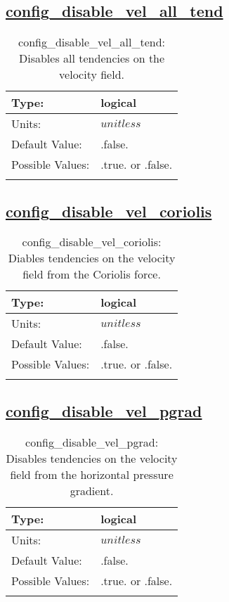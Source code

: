 \subsection[config\_disable\_vel\_all\_tend]{\hyperref[sec:nm_tab_debug]{config\_disable\_vel\_all\_tend}}
\label{subsec:nm_sec_config_disable_vel_all_tend}
\begin{center}
\begin{longtable}{| p{2.0in} | p{4.0in} |}
    \hline
    Type: & logical \\
    \hline
    Units: & $unitless$ \\
    \hline
    Default Value: & .false. \\
    \hline
    Possible Values: & .true. or .false. \\
    \hline
    \caption{config\_disable\_vel\_all\_tend: Disables all tendencies on the velocity field.}
\end{longtable}
\end{center}
\subsection[config\_disable\_vel\_coriolis]{\hyperref[sec:nm_tab_debug]{config\_disable\_vel\_coriolis}}
\label{subsec:nm_sec_config_disable_vel_coriolis}
\begin{center}
\begin{longtable}{| p{2.0in} | p{4.0in} |}
    \hline
    Type: & logical \\
    \hline
    Units: & $unitless$ \\
    \hline
    Default Value: & .false. \\
    \hline
    Possible Values: & .true. or .false. \\
    \hline
    \caption{config\_disable\_vel\_coriolis: Diables tendencies on the velocity field from the Coriolis force.}
\end{longtable}
\end{center}
\subsection[config\_disable\_vel\_pgrad]{\hyperref[sec:nm_tab_debug]{config\_disable\_vel\_pgrad}}
\label{subsec:nm_sec_config_disable_vel_pgrad}
\begin{center}
\begin{longtable}{| p{2.0in} | p{4.0in} |}
    \hline
    Type: & logical \\
    \hline
    Units: & $unitless$ \\
    \hline
    Default Value: & .false. \\
    \hline
    Possible Values: & .true. or .false. \\
    \hline
    \caption{config\_disable\_vel\_pgrad: Disables tendencies on the velocity field from the horizontal pressure gradient.}
\end{longtable}
\end{center}
